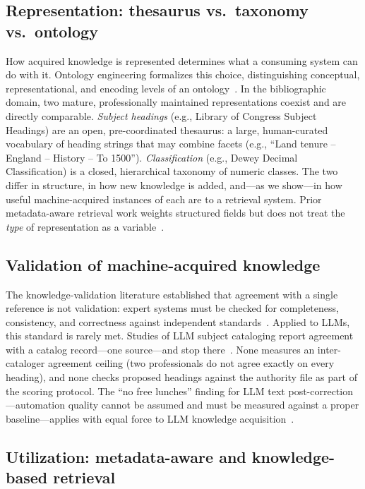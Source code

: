 \subsection{Representation: thesaurus vs.\ taxonomy vs.\ ontology}

How acquired knowledge is represented determines what a consuming system can
do with it. Ontology engineering formalizes this choice, distinguishing
conceptual, representational, and encoding levels of an
ontology~\cite{gruber_portable_ontologies}. In the bibliographic domain,
two mature, professionally maintained representations coexist and are
directly comparable. \textit{Subject headings} (e.g., Library of Congress
Subject Headings) are an open, pre-coordinated thesaurus: a large,
human-curated vocabulary of heading strings that may combine facets (e.g.,
``Land tenure -- England -- History -- To 1500''). \textit{Classification}
(e.g., Dewey Decimal Classification) is a closed, hierarchical taxonomy of
numeric classes. The two differ in structure, in how new knowledge is
added, and---as we show---in how useful machine-acquired instances of each
are to a retrieval system. Prior metadata-aware retrieval work weights
structured fields but does not treat the \textit{type} of representation as
a variable~\cite{bm25f, prf_bm25}.

\subsection{Validation of machine-acquired knowledge}

The knowledge-validation literature established that agreement with a single
reference is not validation: expert systems must be checked for
completeness, consistency, and correctness against independent
standards~\cite{okeefe_kbs_validation}. Applied to LLMs, this standard is
rarely met. Studies of LLM subject cataloging report agreement with a
catalog record---one source---and stop
there~\cite{holstrom_llm_cataloging, characterising_ai_cataloguing,
ital_genai_cataloging, dobreski_chatbots_cataloging}. None measures an
inter-cataloger agreement ceiling (two professionals do not agree exactly on
every heading), and none checks proposed headings against the authority
file as part of the scoring protocol. The ``no free lunches'' finding for
LLM text post-correction---automation quality cannot be assumed and must be
measured against a proper baseline---applies with equal force to LLM
knowledge acquisition~\cite{ocr_no_free_lunches}.

\subsection{Utilization: metadata-aware and knowledge-based retrieval}

